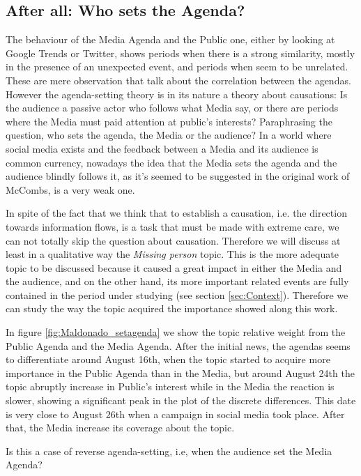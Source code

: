 \subsection{After all: Who sets the Agenda?}
\label{sec:who_sets}

\par The behaviour of the Media Agenda and the Public one, either by looking at Google Trends or Twitter, shows periods when there is a strong similarity, mostly in the presence of an unexpected event, and periods when seem to be unrelated.
These are mere observation that talk about the correlation between the agendas.
However the agenda-setting theory is in its nature a theory about causations:
Is the audience a passive actor who follows what Media say, or there are periods where the Media must paid attention at public's interests?
Paraphrasing the question, who sets the agenda, the Media or the audience?
In a world where social media exists and the feedback between a Media and its audience is common currency, nowadays the idea that the Media sets the agenda and the audience blindly follows it, as it's seemed to be suggested in the original work of McCombs, is a very weak one. 
\par In spite of the fact that we think that to establish a causation, i.e. the direction towards information flows, is a task that must be made with extreme care, we can not totally skip the question about causation. 
Therefore we will discuss at least in a qualitative way the \emph{Missing person} topic. 
This is the more adequate topic to be discussed because it caused a great impact in either the Media and the audience, and on the other hand, its more important related events are fully contained in the period under studying (see section \ref{sec:Context}).
Therefore we can study the way the topic acquired the importance showed along this work.
\par In figure \ref{fig:Maldonado_setagenda} we show the topic relative weight from the Public Agenda and the Media Agenda. 
After the initial news, the agendas seems to differentiate around August 16th, when the topic started to acquire more importance in the Public Agenda than in the Media, but around August 24th the topic abruptly increase in Public's interest while in the Media the reaction is slower, showing a significant peak in the plot of the discrete differences.
This date is very close to August 26th when a campaign in social media took place. After that, the Media increase its coverage about the topic.
\par Is this a case of reverse agenda-setting, i.e, when the audience set the Media Agenda? 
